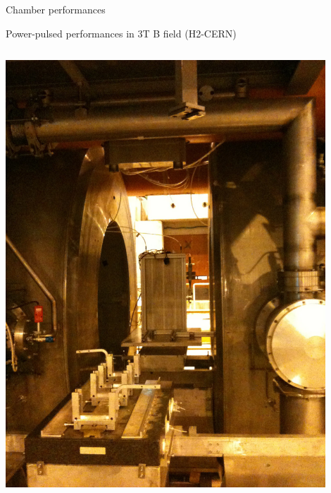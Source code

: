 \documentclass[10pt]{beamer}
\begin{document}
\begin{frame}{Chamber performances  }
  \begin{block}{Power-pulsed performances in 3T B field (H2-CERN)}
    \begin{columns}

      \begin{column}{0.5\textwidth}
        \centerline{\includegraphics[width=0.9\textwidth]{jpg/PowerPulsingPhoto}}
      \end{column}
      

\end{columns}
\end{block}
\end{frame}
\end{document}
